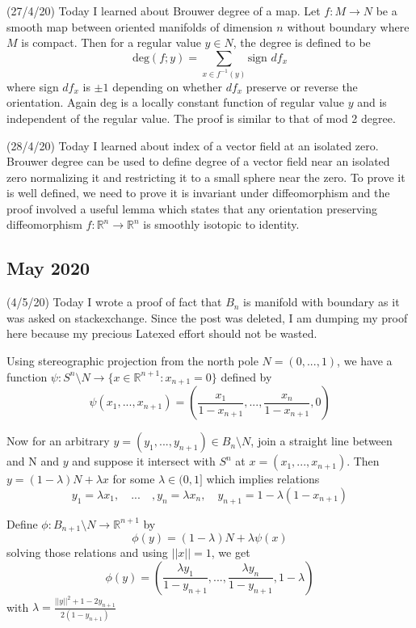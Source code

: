 \documentclass[12pt,a4paper]{article}
\begin{document}
(27/4/20) Today I learned about Brouwer degree of a map. Let $f:M \to N$ be a smooth map between oriented manifolds of dimension $n$ without boundary where $M$ is compact. Then for a regular value $y\in N$, the degree is defined to be $$\text{deg}(f;y)= \sum_{x \in f^{-1}(y)} \text{sign }df_x$$
where sign $df_x$ is $\pm 1$ depending on whether $df_x$ preserve or reverse the orientation. Again deg is a locally constant function of regular value $y$ and is independent of the regular value. The proof is similar to that of mod 2 degree.

(28/4/20) Today I learned about index of a vector field at an isolated zero. Brouwer degree can be used to define degree of a vector field near an isolated zero normalizing it and restricting it to a small sphere near the zero. To prove it is well defined, we need to prove it is invariant under diffeomorphism and the proof involved a useful lemma which states that any orientation preserving diffeomorphism $f: \mathbb{R}^n \to \mathbb{R}^n$ is smoothly isotopic to identity. 

\subsection*{May 2020}

\quad (4/5/20) Today I wrote a proof of fact that $B_n$ is manifold with boundary as it was asked on stackexchange. Since the post was deleted, I am dumping my proof here because my precious Latexed effort should not be wasted.

Using stereographic projection from the north pole $N=(0,...,1)$, we have a function $\psi :S^n\setminus N \to \{x \in \mathbb{R}^{n+1} : x_{n+1}=0\}$ defined by $$\psi (x_1,...,x_{n+1}) = \left( \frac{x_1}{1-x_{n+1}},...,\frac{x_n}{1-x_{n+1}},0\right) $$

Now for an arbitrary $y = (y_1,...,y_{n+1})\in B_n\setminus N $, join a straight line between and N and $y$ and suppose it intersect with $S^n$ at $x = (x_1,...,x_{n+1})$.
Then $y = (1-\lambda) N+ \lambda x$ for some $\lambda \in (0,1]$ which implies relations $$y_1=\lambda x_1,\quad ...\quad ,y_n = \lambda x_n, \quad y_{n+1}= 1- \lambda (1-x_{n+1})$$

Define $\phi : B_{n+1}\setminus N \to \mathbb{R}^{n+1}$ by $$\phi (y) = (1-\lambda) N+ \lambda \psi(x)$$ solving those relations and using $||x|| = 1$, we get 
$$\phi(y) = \left( \frac{\lambda y_1}{1-y_{n+1}},...,\frac{\lambda y_n}{1-y_{n+1}}, 1- \lambda\right) $$  with $\lambda = \frac{||y||^2 +1 -2y_{n+1}}{2(1-y_{n+1})}$
\end{document}
